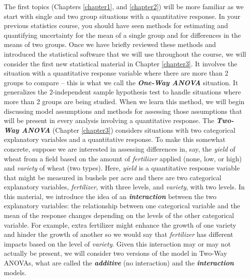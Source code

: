 \documentclass[
]{book}
\begin{document}
\indent The first topics (Chapters \ref{chapter1}, and \ref{chapter2}) will be more
familiar as we start with single and two group situations
with a quantitative response. In your previous statistics course, you should
have seen methods for estimating and quantifying uncertainty for the mean of a
single group and for differences in the means of two groups. Once we have briefly
reviewed these methods and introduced the statistical software that we will use
throughout the course, we will consider the first new statistical material in
Chapter \ref{chapter3}. It involves the situation with a quantitative response
variable where
there are more than 2 groups to compare -- this is what we call the \textbf{\emph{One-Way
ANOVA}} situation. It generalizes the 2-independent sample hypothesis
test to handle situations where more than 2 groups are being studied. When we
learn this method, we will begin discussing model assumptions  and methods for
assessing those assumptions that will be present in every analysis involving a
quantitative response. The \textbf{\emph{Two-Way ANOVA}} (Chapter \ref{chapter3})
considers situations with two categorical explanatory variables and a
quantitative response. To make
this somewhat concrete, suppose we are interested in assessing differences in,
say, the \emph{yield} of wheat from a field based on the amount of \emph{fertilizer} applied
(none, low, or high) and \emph{variety} of wheat (two types). Here, \emph{yield} is a quantitative response variable that might be measured in bushels per acre and
there are two categorical explanatory variables, \emph{fertilizer}, with three levels, and \emph{variety}, with two levels. In this material, we introduce the idea of an
\textbf{\emph{interaction}} between the two explanatory variables:  the relationship between one categorical
variable and the mean of the response changes depending on the levels of the
other categorical variable. For example, extra fertilizer might enhance the
growth of one variety and hinder the growth of another so we would say that \emph{fertilizer} has different impacts based on the level of \emph{variety}. Given this interaction may or may not actually be present, we will consider two versions of the model in Two-Way ANOVAs,  what are called the \textbf{\emph{additive}}  (no interaction) and the \textbf{\emph{interaction}}  models.
\end{document}
